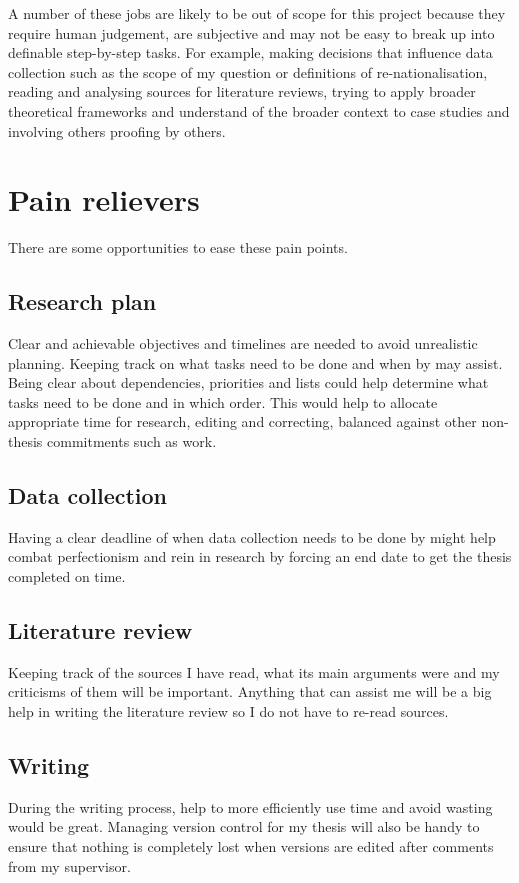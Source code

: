 \documentclass{article}
\begin{document}
A number of these jobs are likely to be out of scope for this project because they require human judgement, are subjective and may not be easy to break up into definable step-by-step tasks. For example, making decisions that influence data collection such as the scope of my question or definitions of re-nationalisation, reading and analysing sources for literature reviews, trying to apply broader theoretical frameworks and understand of the broader context to case studies and involving others proofing by others.

\section*{Pain relievers}

There are some opportunities to ease these pain points.\par
\subsection*{Research plan}
Clear and achievable objectives and timelines are needed to avoid unrealistic planning. Keeping track on what tasks need to be done and when by may assist. Being clear about dependencies, priorities and lists could help determine what tasks need to be done and in which order. This would help to allocate appropriate time for research, editing and correcting, balanced against other non-thesis commitments such as work.
\subsection*{Data collection}
Having a clear deadline of when data collection needs to be done by might help combat perfectionism and rein in research by forcing an end date to get the thesis completed on time. 
\subsection*{Literature review}
Keeping track of the sources I have read, what its main arguments were and my criticisms of them will be important. Anything that can assist me will be a big help in writing the literature review so I do not have to re-read sources. 
\subsection*{Writing}
During the writing process, help to more efficiently use time and avoid wasting would be great. Managing version control for my thesis will also be handy to ensure that nothing is completely lost when versions are edited after comments from my supervisor.\par
\end{document}

